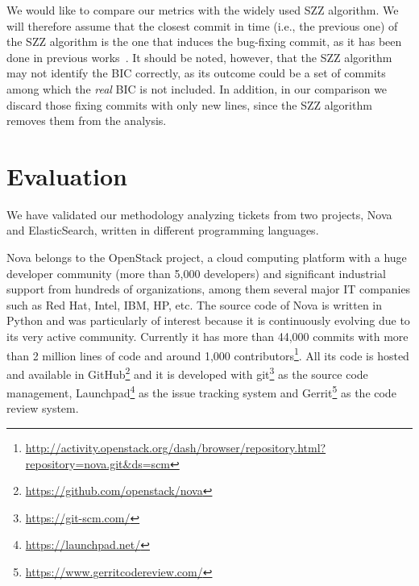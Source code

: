 \documentclass[10pt, conference]{IEEEtran}
\begin{document}
We would like to compare our metrics with the widely used SZZ algorithm. We will therefore assume that the closest commit in time (i.e., the previous one) of the SZZ algorithm is the one that induces the bug-fixing commit, as it has been done in previous works~\cite{eyolfson2011time}. It should be noted, however, that the SZZ algorithm may not identify the BIC correctly, as its outcome could be a set of commits among which the \emph{real} BIC is not included. In addition, in our comparison we discard those fixing commits with only new lines, since the SZZ algorithm removes them from the analysis.


\section{Evaluation}
\label{sec:evaluation}

We have validated our methodology analyzing tickets from two projects, Nova and ElasticSearch, written in different programming languages. %

Nova belongs to the OpenStack project, a cloud computing platform with a huge developer community (more than 5,000 developers) and significant industrial support from hundreds of organizations, among them several major IT companies such as Red Hat, Intel, IBM, HP, etc. The source code of Nova is written in Python and was particularly of interest because it is continuously evolving due to its very active community. Currently it has more than 44,000 commits with more than 2 million lines of code and around 1,000 contributors\footnote{\url{http://activity.openstack.org/dash/browser/repository.html?repository=nova.git&ds=scm}}. All its code is hosted and available in GitHub\footnote{\url{https://github.com/openstack/nova}} and it is developed with git\footnote{\url{https://git-scm.com/}} as the source code management, Launchpad\footnote{\url{https://launchpad.net/}} as the issue tracking system and Gerrit\footnote{\url{https://www.gerritcodereview.com/}} as the code review system.
\end{document}
